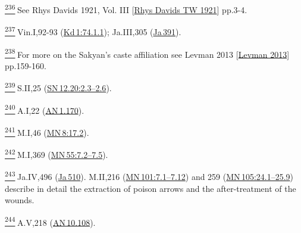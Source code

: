 \label{footprints_split_024.html_fn236}
\hyperref[footprints_split_010.htmlux5cux23fnref236]{\textsuperscript{236}} See
{Rhys Davids 1921, Vol. III
{{[}\hyperref[footprints_split_022.htmlux5cux23Rhysux5cux2520Davidsux5cux2520TWux5cux25201921]{Rhys
Davids TW 1921}{]}}} pp.3-4.

\label{footprints_split_024.html_fn237}
\hyperref[footprints_split_010.htmlux5cux23fnref237]{\textsuperscript{237}} Vin.I,92-93
(\href{https://suttacentral.net/pli-tv-kd1/en/brahmali?\#74.1.1}{Kd\,1:74.1.1});
Ja.III,305
(\href{https://suttacentral.net/ja391/en/francis-neil?reference=main/pts&highlight=false\#pts-vp-pli305}{Ja\,391}).

\label{footprints_split_024.html_fn238}
\hyperref[footprints_split_010.htmlux5cux23fnref238]{\textsuperscript{238}} For
more on the Sakyan's caste affiliation see {Levman 2013
{{[}\hyperref[footprints_split_022.htmlux5cux23Levmanux5cux25202013]{Levman
2013}{]}}} pp.159-160.

\label{footprints_split_024.html_fn239}
\hyperref[footprints_split_010.htmlux5cux23fnref239]{\textsuperscript{239}} S.II,25
(\href{https://suttacentral.net/sn12.20/en/sujato\#2.3}{SN\,12.20:2.3--2.6}).

\label{footprints_split_024.html_fn240}
\hyperref[footprints_split_010.htmlux5cux23fnref240]{\textsuperscript{240}} A.I,22
(\href{https://suttacentral.net/an1.170/en/sujato}{AN\,1.170}).

\label{footprints_split_024.html_fn241}
\hyperref[footprints_split_010.htmlux5cux23fnref241]{\textsuperscript{241}} M.I,46
(\href{https://suttacentral.net/mn8/en/sujato\#17.2}{MN\,8:17.2}).

\label{footprints_split_024.html_fn242}
\hyperref[footprints_split_010.htmlux5cux23fnref242]{\textsuperscript{242}} M.I,369
(\href{https://suttacentral.net/mn55/en/sujato\#7.2}{MN\,55:7.2--7.5}).

\label{footprints_split_024.html_fn243}
\hyperref[footprints_split_010.htmlux5cux23fnref243]{\textsuperscript{243}} Ja.IV,496
(\href{https://suttacentral.net/ja510/en/rouse\#pts-vp-pli496}{Ja\,510}).
M.II,216
(\href{https://suttacentral.net/mn101/en/sujato\#7.1}{MN\,101:7.1--7.12})
and 259
(\href{https://suttacentral.net/mn105/en/sujato\#24.1}{MN\,105:24.1--25.9})
describe in detail the extraction of poison arrows and the
after-treatment of the wounds.

\label{footprints_split_024.html_fn244}
\hyperref[footprints_split_010.htmlux5cux23fnref244]{\textsuperscript{244}} A.V,218
(\href{https://suttacentral.net/an10.108/en/sujato}{AN\,10.108}).

